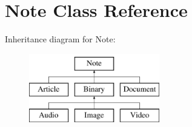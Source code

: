 \hypertarget{classNote}{\section{\-Note \-Class \-Reference}
\label{classNote}
}
\-Inheritance diagram for \-Note\-:\begin{figure}[H]
\begin{center}
\leavevmode
\includegraphics[height=3.000000cm]{classNote}
\end{center}
\end{figure}
